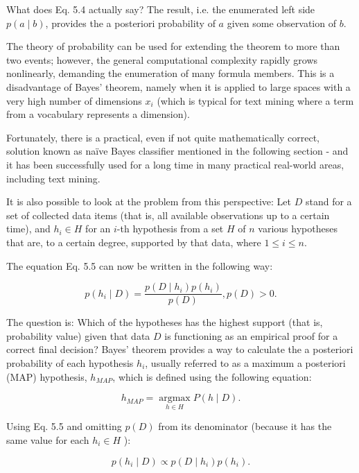 \documentclass[11pt,openany,executivepaper]{book}
\begin{document}
What does Eq. 5.4 actually say? The result, i.e. the enumerated left side $p(a \mid b)$, provides the a posteriori probability of $a$ given some observation of $b$.

The theory of probability can be used for extending the theorem to more than two events; however, the general computational complexity rapidly grows nonlinearly, demanding the enumeration of many formula members. This is a disadvantage of Bayes' theorem, namely when it is applied to large spaces with a very high number of dimensions $x_{i}$ (which is typical for text mining where a term from a vocabulary represents a dimension).

Fortunately, there is a practical, even if not quite mathematically correct, solution known as naïve Bayes classifier mentioned in the following section - and it has been successfully used for a long time in many practical real-world areas, including text mining.

It is also possible to look at the problem from this perspective: Let $D$ stand for a set of collected data items (that is, all available observations up to a certain time), and $h_{i} \in H$ for an $i$-th hypothesis from a set $H$ of $n$ various hypotheses that are, to a certain degree, supported by that data, where $1 \leq i \leq n$.

The equation Eq. 5.5 can now be written in the following way:


\begin{equation*}
p\left(h_{i} \mid D\right)=\frac{p\left(D \mid h_{i}\right) p\left(h_{i}\right)}{p(D)}, p(D)>0 . \tag{5.5}
\end{equation*}


The question is: Which of the hypotheses has the highest support (that is, probability value) given that data $D$ is functioning as an empirical proof for a correct final decision? Bayes' theorem provides a way to calculate the a posteriori probability of each hypothesis $h_{i}$, usually referred to as a maximum a posteriori (MAP) hypothesis, $h_{M A P}$, which is defined using the following equation:


\begin{equation*}
h_{M A P}=\underset{h \in H}{\operatorname{argmax}} P(h \mid D) . \tag{5.6}
\end{equation*}


Using Eq. 5.5 and omitting $p(D)$ from its denominator (because it has the same value for each $h_{i} \in H$ ):


\begin{equation*}
p\left(h_{i} \mid D\right) \propto p\left(D \mid h_{i}\right) p\left(h_{i}\right) . \tag{5.7}
\end{equation*}
\end{document}
